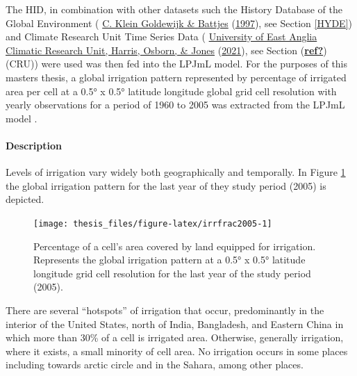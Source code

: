 \documentclass[12pt,twoside]{reedthesis}
\begin{document}
The HID, in combination with other datasets such the History Database of the Global Environment ( \protect\hyperlink{ref-kleingoldewijkHundredYear18901997}{C. Klein Goldewijk \& Battjes} (\protect\hyperlink{ref-kleingoldewijkHundredYear18901997}{1997}), see Section \ref{HYDE}) and Climate Research Unit Time Series Data ( \protect\hyperlink{ref-universityofeastangliaclimaticresearchunitVersionCRUTS2021}{University of East Anglia Climatic Research Unit, Harris, Osborn, \& Jones} (\protect\hyperlink{ref-universityofeastangliaclimaticresearchunitVersionCRUTS2021}{2021}), see Section (\protect\hyperlink{ref-ref}{\textbf{ref?}})(CRU)) were used was then fed into the LPJmL model. For the purposes of this masters thesis, a global irrigation pattern represented by percentage of irrigated area per cell at a 0.5° x 0.5° latitude longitude global grid cell resolution with yearly observations for a period of 1960 to 2005 was extracted from the LPJmL model .

\hypertarget{irrfracdesc}{%
\paragraph{Description}\label{irrfracdesc}}

Levels of irrigation vary widely both geographically and temporally. In Figure \ref{fig:irrfrac2005} the global irrigation pattern for the last year of they study period (2005) is depicted.
\begin{figure}

{\centering \texttt{[image: thesis\_files/figure-latex/irrfrac2005-1]} 

}

\caption[Irrigation fraction per grid cell of the study area in 2005.]{Percentage of a cell's area covered by land equipped for irrigation. Represents the global irrigation pattern at a 0.5° x 0.5° latitude longitude grid cell resolution for the last year of the study period (2005).}\label{fig:irrfrac2005}
\end{figure}
There are several ``hotspots'' of irrigation that occur, predominantly in the interior of the United States, north of India, Bangladesh, and Eastern China in which more than 30\% of a cell is irrigated area. Otherwise, generally irrigation, where it exists, a small minority of cell area. No irrigation occurs in some places including towards arctic circle and in the Sahara, among other places.
\end{document}
